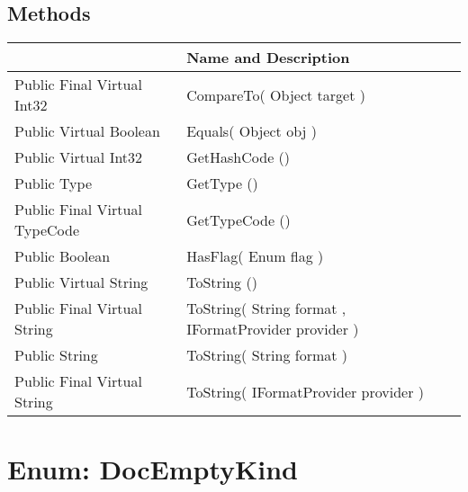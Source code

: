 \documentclass[11pt, oneside, a4paper]{book}
\begin{document}
\subsection{Methods}
\begin{center}
\begin{tabular}{| p{3cm} | p{12cm} | }
\hline
\textbf{ } & \textbf{ Name and Description}\\
\hline
 Public  Final  Virtual  Int32 &  CompareTo(\hypertarget{SoftwareEngineeringTools.{}Documentation.{}DocCharKind.{}CompareTo\_Object}{} Object  target  )\\
\hline
 Public  Virtual  Boolean &  Equals(\hypertarget{SoftwareEngineeringTools.{}Documentation.{}DocCharKind.{}Equals\_Object}{} Object  obj  )\\
\hline
 Public  Virtual  Int32 &  GetHashCode ()\hypertarget{SoftwareEngineeringTools.{}Documentation.{}DocCharKind.{}GetHashCode}{}\\
\hline
 Public  Type &  GetType ()\hypertarget{SoftwareEngineeringTools.{}Documentation.{}DocCharKind.{}GetType}{}\\
\hline
 Public  Final  Virtual  TypeCode &  GetTypeCode ()\hypertarget{SoftwareEngineeringTools.{}Documentation.{}DocCharKind.{}GetTypeCode}{}\\
\hline
 Public  Boolean &  HasFlag(\hypertarget{SoftwareEngineeringTools.{}Documentation.{}DocCharKind.{}HasFlag\_Enum}{} Enum  flag  )\\
\hline
 Public  Virtual  String &  ToString ()\hypertarget{SoftwareEngineeringTools.{}Documentation.{}DocCharKind.{}ToString}{}\\
\hline
 Public  Final  Virtual  String &  ToString(\hypertarget{SoftwareEngineeringTools.{}Documentation.{}DocCharKind.{}ToString\_String\_IFormatProvider}{} String  format  ,  IFormatProvider  provider  )\\
\hline
 Public  String &  ToString(\hypertarget{SoftwareEngineeringTools.{}Documentation.{}DocCharKind.{}ToString\_String}{} String  format  )\\
\hline
 Public  Final  Virtual  String &  ToString(\hypertarget{SoftwareEngineeringTools.{}Documentation.{}DocCharKind.{}ToString\_IFormatProvider}{} IFormatProvider  provider  )\\
\hline
\end{tabular}
\end{center}
 


\hypertarget{SoftwareEngineeringTools.{}Documentation.{}DocEmptyKind}{}
\section{Enum: DocEmptyKind}
\end{document}
